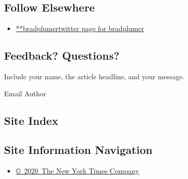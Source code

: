 \hypertarget{follow-elsewhere}{%
\subsection{Follow Elsewhere}\label{follow-elsewhere}}

\begin{itemize}
\tightlist
\item
  \href{https://twitter.com/bradplumer}{**bradplumertwitter page for
  bradplumer}
\end{itemize}

\hypertarget{feedback-questions}{%
\subsection{Feedback? Questions?}\label{feedback-questions}}

Include your name, the article headline, and your message.

Email Author

\hypertarget{site-index}{%
\subsection{Site Index}\label{site-index}}

\hypertarget{site-information-navigation}{%
\subsection{Site Information
Navigation}\label{site-information-navigation}}

\begin{itemize}
\tightlist
\item
  \href{https://help.nytimes3xbfgragh.onion/hc/en-us/articles/115014792127-Copyright-notice}{©~2020~The
  New York Times Company}
\end{itemize}

